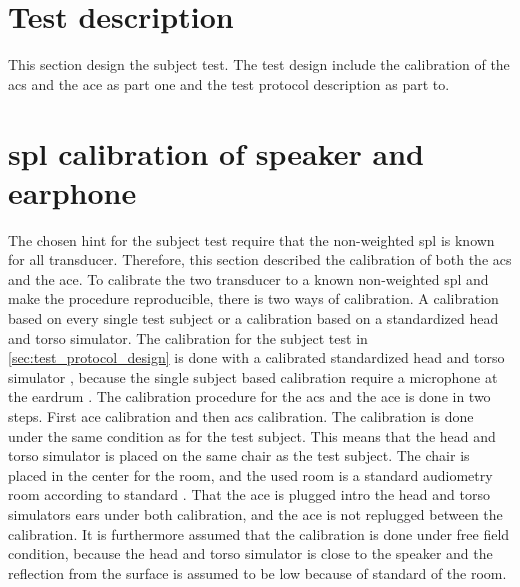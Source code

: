 

\section{Test description}
\label{sec:test_description}
This section design the subject test. The test design include the calibration of the \gls{acs} and the \gls{ace} as part one and the test protocol description as part to. 







\section{\gls{spl} calibration of speaker and earphone}
The chosen \gls{hint} for the subject test require that the non-weighted \gls{spl} is known for all transducer. Therefore, this section described the calibration of both the \gls{acs} and the \gls{ace}. To calibrate the two transducer to a known non-weighted \gls{spl} and make the procedure reproducible, there is two ways of calibration. A calibration based on every single test subject or a calibration based on a standardized head and torso simulator. The calibration for the subject test in \autoref{sec:test_protocol_design}  is done with a calibrated standardized head and torso simulator \citep{iso_11904-2}, because the single subject based calibration require a microphone at the eardrum \citep{iso_11904-1}. The calibration procedure for the \gls{acs} and the \gls{ace} is done in two steps. First \gls{ace} calibration and then \gls{acs} calibration. The calibration is done under the same condition as for the test subject. This means that the head and torso simulator is placed on the same chair as the test subject. The chair is placed in the center for the room, and the used room is a standard audiometry room according to standard \citep{iso_8253-2}. That the \gls{ace} is plugged intro the head and torso simulators ears under both calibration, and the \gls{ace} is not replugged between the calibration. It is furthermore assumed that the calibration is done under free field condition, because the head and torso simulator is close to the speaker and the reflection from the surface is assumed to be low because of standard of the room. 


